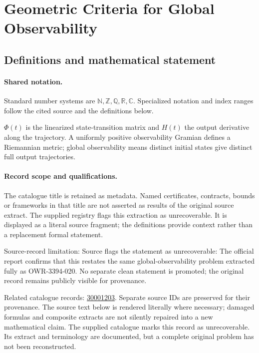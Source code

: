 \documentclass[11pt]{article}
\begin{document}
\section{Geometric Criteria for Global Observability}\label{statement}

\subsection{Definitions and mathematical statement}

\paragraph{Shared notation.}Standard number systems are $\mathbb N,\mathbb Z,\mathbb Q,\mathbb R,\mathbb C$. Specialized notation and index ranges follow the cited source and the definitions below.


$\Phi(t)$ is the linearized state-transition matrix and $H(t)$ the output derivative along the trajectory. A uniformly positive observability Gramian defines a Riemannian metric; global observability means distinct initial states give distinct full output trajectories.
\paragraph{Record scope and qualifications.}
The catalogue title is retained as metadata. Named certificates, contracts, bounds or frameworks in that title are not asserted as results of the original source extract.
The supplied registry flags this extraction as unrecoverable. It is displayed as a literal source fragment; the definitions provide context rather than a replacement formal statement.

Source-record limitation: Source flags the statement as unrecoverable: The official report confirms that this restates the same global-observability problem extracted fully as OWR-3394-020. No separate clean statement is promoted; the original record remains publicly visible for provenance.

Related catalogue records: \href{https://mehmetmars7.github.io/Erdosproblems-llm-hunter/problem.html?type=open_problems&id=30001203}{30001203}. Separate source IDs are preserved for their provenance.
The source text below is rendered literally where necessary; damaged formulas and composite extracts are not silently repaired into a new mathematical claim.
The supplied catalogue marks this record as unrecoverable. Its extract and terminology are documented, but a complete original problem has not been reconstructed.
\end{document}
